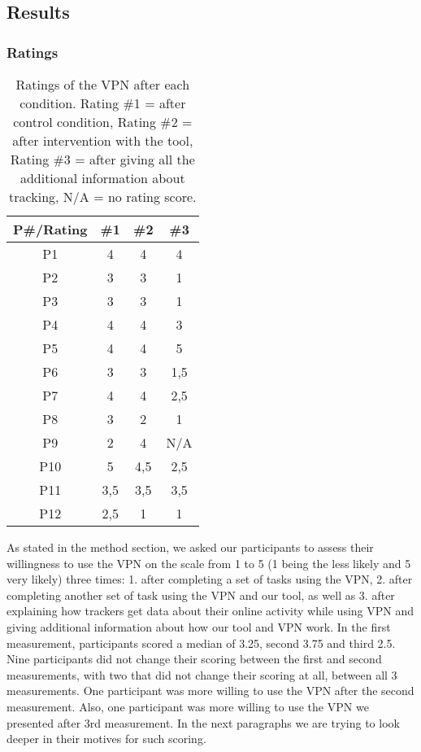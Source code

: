 \subsection{Results}\label{sec:results}

\subsubsection{Ratings}

\begin{table}[h!]
\centering
\begin{tabular}{|c c c c|} 
 \hline
P\#/Rating & \#1 & \#2 & \#3 \\
\hline
P1 & 4 & 4 & 4\\
P2 & 3 & 3 & 1\\
P3 & 3 & 3 & 1\\
P4 & 4 & 4 & 3\\
P5 & 4 & 4 & 5\\
P6 & 3 & 3 & 1,5\\
P7 & 4 & 4 & 2,5\\
P8 & 3 & 2 & 1\\
P9 & 2 & 4 & N/A\\
P10 & 5 & 4,5 & 2,5\\
P11 & 3,5 & 3,5 & 3,5\\
P12 & 2,5 & 1 & 1 \\
 \hline
\end{tabular}
\caption{Ratings of the VPN after each condition. Rating \#1 = after control condition, Rating \#2 = after intervention with the tool, Rating \#3 = after giving all the additional information about tracking, N/A = no rating score.}
\label{table:2}
\end{table}
As stated in the method section, we asked our participants to assess their
willingness to use the VPN on the scale from 1 to 5 (1 being the less likely
and 5 very likely) three times: 1.	after completing a set of tasks using the
VPN, 2.	after completing another set of task using the VPN and our tool, as
well as 3.	after explaining how trackers get data about their online activity
while using VPN and giving additional information about  how our tool and VPN
work.  In the first measurement, participants scored a median of 3.25, second
3.75 and third 2.5. Nine participants did not change their scoring between the
first and second measurements, with two that did not change their scoring at
all, between all 3 measurements. One participant was more willing to use the
VPN after the second measurement. Also, one participant was more willing to
use the VPN we presented after 3rd measurement.  In the next paragraphs we are
trying to look deeper in their motives for such scoring.  
    


